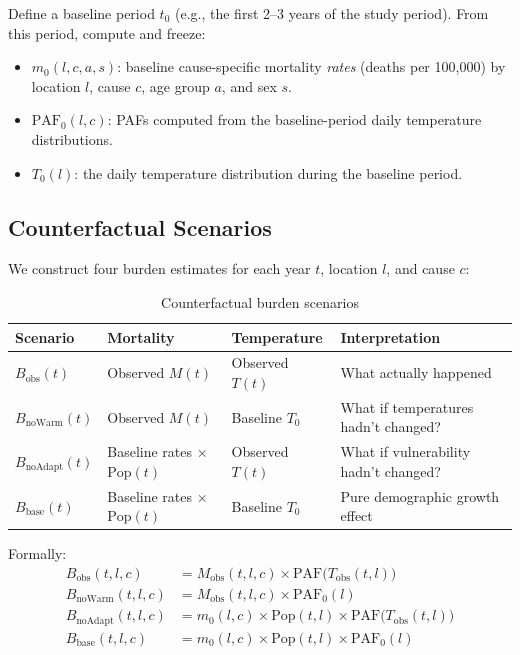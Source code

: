 \documentclass[11pt,a4paper]{article}
\begin{document}
Define a baseline period $t_0$ (e.g., the first 2--3 years of the study period). From this period, compute and freeze:
\begin{itemize}[nosep]
  \item $m_0(l,c,a,s)$: baseline cause-specific mortality \emph{rates} (deaths per 100,000) by location $l$, cause $c$, age group $a$, and sex $s$.
  \item $\text{PAF}_0(l,c)$: PAFs computed from the baseline-period daily temperature distributions.
  \item $T_0(l)$: the daily temperature distribution during the baseline period.
\end{itemize}

\subsection{Counterfactual Scenarios}

We construct four burden estimates for each year $t$, location $l$, and cause $c$:

\medskip

\begin{table}[H]
\centering
\small
\caption{Counterfactual burden scenarios}
\label{tab:scenarios}
\begin{tabular}{@{}llll@{}}
\toprule
\textbf{Scenario} & \textbf{Mortality} & \textbf{Temperature} & \textbf{Interpretation} \\
\midrule
$B_{\text{obs}}(t)$ & Observed $M(t)$ & Observed $T(t)$ & What actually happened \\[0.3em]
$B_{\text{noWarm}}(t)$ & Observed $M(t)$ & Baseline $T_0$ & What if temperatures hadn't changed? \\[0.3em]
$B_{\text{noAdapt}}(t)$ & Baseline rates $\times$ $\text{Pop}(t)$ & Observed $T(t)$ & What if vulnerability hadn't changed? \\[0.3em]
$B_{\text{base}}(t)$ & Baseline rates $\times$ $\text{Pop}(t)$ & Baseline $T_0$ & Pure demographic growth effect \\
\bottomrule
\end{tabular}
\end{table}

\medskip

Formally:
\begin{align}
  B_{\text{obs}}(t,l,c) &= M_{\text{obs}}(t,l,c) \times \text{PAF}\bigl(T_{\text{obs}}(t,l)\bigr) \label{eq:obs}\\[0.5em]
  B_{\text{noWarm}}(t,l,c) &= M_{\text{obs}}(t,l,c) \times \text{PAF}_0(l) \label{eq:nowarm}\\[0.5em]
  B_{\text{noAdapt}}(t,l,c) &= m_0(l,c) \times \text{Pop}(t,l) \times \text{PAF}\bigl(T_{\text{obs}}(t,l)\bigr) \label{eq:noadapt}\\[0.5em]
  B_{\text{base}}(t,l,c) &= m_0(l,c) \times \text{Pop}(t,l) \times \text{PAF}_0(l) \label{eq:base}
\end{align}
\end{document}
